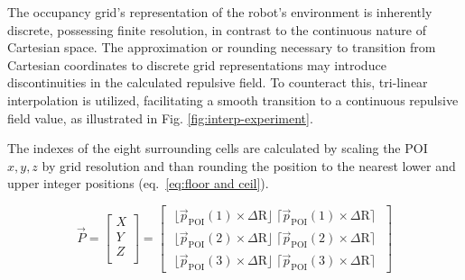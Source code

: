 \documentclass[letterpaper, 10 pt, conference]{ieeeconf}  %
\begin{document}
The occupancy grid's representation of the robot's environment is inherently discrete, possessing finite resolution, in contrast to the continuous nature of Cartesian space. The approximation or rounding necessary to transition from Cartesian coordinates to discrete grid representations may introduce discontinuities in the calculated repulsive field. To counteract this, tri-linear interpolation is utilized, facilitating a smooth transition to a continuous repulsive field value, as illustrated in Fig. \ref{fig:interp-experiment}.


The indexes of the eight surrounding cells are calculated by scaling the POI $x,y,z$ by grid resolution and than rounding the position to the nearest lower and upper integer positions (eq.~\ref{eq:floor and ceil}).

\begin{equation}
	\label{eq:floor and ceil}
	\vec{P} =
	\begin{bmatrix}
		X \\
		Y \\
		Z \\
	\end{bmatrix}
	=
	\begin{bmatrix}
		\; \lfloor \vec{p}_{\mathrm{POI}}(1) \times\Delta \mathrm{R} \rfloor \; \lceil \vec{p}_{\mathrm{POI}}(1) \times\Delta \mathrm{R} \rceil \;  \\
		\; \lfloor \vec{p}_{\mathrm{POI}}(2) \times\Delta \mathrm{R} \rfloor \; \lceil \vec{p}_{\mathrm{POI}}(2) \times\Delta \mathrm{R} \rceil \; \\
		\; \lfloor \vec{p}_{\mathrm{POI}}(3) \times\Delta \mathrm{R} \rfloor \; \lceil \vec{p}_{\mathrm{POI}}(3) \times\Delta \mathrm{R} \rceil \; 
	\end{bmatrix}
\end{equation}
\end{document}
